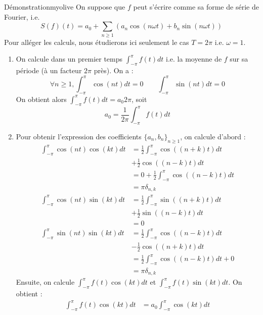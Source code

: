     \begin{omed}{Démonstration}{myolive}
        On suppose que $f$ peut s’écrire comme sa forme de série de Fourier, i.e. 
        \[ S(f)(t) = a_0 + \sum\limits_{n \geq 1} \left(a_n\cos(n \omega t) + b_n \sin(n \omega t)\right) \]
        Pour alléger les calculs, nous étudierons ici seulement le cas $T = 2 \pi$ i.e. $\omega = 1$.
        \begin{enumerate}
            \item On calcule dans un premier temps $\int_{-\pi}^{\pi} f(t)dt$ i.e. la moyenne de $f$ sur sa période (à un facteur $2 \pi$ près). On a :
            \[ \forall n \geq 1, \int_{-\pi}^{\pi} \cos(nt)dt = 0 \qquad \int_{-\pi}^{\pi} \sin(nt)dt = 0 \]
            On obtient alors $ \int_{-\pi}^{\pi} f(t)dt = a_0 2 \pi$, soit 
            \[ a_0 = \frac{1}{2\pi} \int_{-\pi}^{\pi} f(t)dt \]
            \item Pour obtenir l’expression des coefficients $\{a_n, b_n\}_{n \geq 1}$, on calcule d’abord :
                \begin{align*}
                    \int_{-\pi}^{\pi} \cos(nt)\cos(kt)dt &= \frac{1}{2} \int_{-\pi}^{\pi} \cos((n+k)t)dt \\
                    &+ \frac{1}{2}\cos((n-k)t)dt \\
                    &= 0 + \frac{1}{2} \int_{-\pi}^{\pi} \cos((n-k)t)dt \\
                    &= \pi \delta_{n,k} \\
                    \int_{-\pi}^{\pi} \cos(nt) \sin(kt) dt&= \frac{1}{2} \int_{-\pi}^{\pi} \sin((n+k)t)dt \\
                    &+ \frac{1}{2}\sin((n-k)t)dt \\
                    &= 0 \\
                    \int_{-\pi}^{\pi} \sin(nt)\sin(kt)dt &= \frac{1}{2} \int_{-\pi}^{\pi}\cos((n-k)t)dt \\
                    &- \frac{1}{2} \cos((n+k)t)dt \\
                    &= \frac{1}{2} \int_{-\pi}^{\pi} \cos((n-k)t)dt + 0 \\
                    &= \pi \delta_{n,k}
                \end{align*}
            Ensuite, on calcule $ \int_{-\pi}^{\pi} f(t)\cos(kt)dt$ et $\int_{-\pi }^{\pi} f(t)\sin(kt)dt$. On obtient :
                \begin{align*}
                    \int_{-\pi}^{\pi} f(t) \cos(kt) dt &= a_0 \int_{-\pi}^{\pi} \cos(kt)dt \\

\end{align*}
\end{enumerate}
\end{omed}
